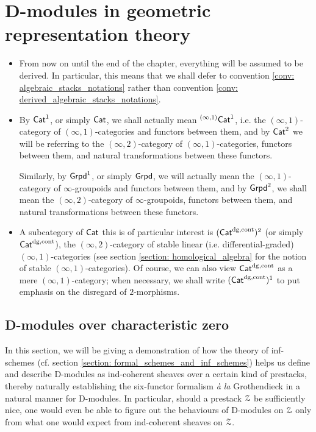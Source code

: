 \chapter{D-modules in geometric representation theory}
    \begin{abstract}
        
    \end{abstract}
    
    \minitoc
    
    \begin{convention} \label{conv: D_modules_everything_is_derived}
        \noindent
        \begin{itemize}
            \item From now on until the end of the chapter, everything will be assumed to be derived. In particular, this means that we shall defer to convention \ref{conv: algebraic_stacks_notations} rather than convention \ref{conv: derived_algebraic_stacks_notations}.
            \item By $\mathsf{Cat}^1$, or simply $\mathsf{Cat}$, we shall actually mean ${}^{(\infty, 1)}\mathsf{Cat}^1$, i.e. the $(\infty, 1)$-category of $(\infty, 1)$-categories and functors between them, and by $\mathsf{Cat}^2$ we will be referring to the $(\infty, 2)$-category of $(\infty, 1)$-categories, functors between them, and natural transformations between these functors. 
            
            Similarly, by $\mathsf{Grpd}^1$, or simply $\mathsf{Grpd}$, we will actually mean the $(\infty, 1)$-category of $\infty$-groupoids and functors between them, and by $\mathsf{Grpd}^2$, we shall mean the $(\infty, 2)$-category of $\infty$-groupoids, functors between them, and natural transformations between these functors.
            \item A subcategory of $\mathsf{Cat}$ this is of particular interest is $(\mathsf{Cat}^{\mathrm{dg}, \mathrm{cont}})^2$ (or simply $\mathsf{Cat}^{\mathrm{dg}, \mathrm{cont}}$), the $(\infty, 2)$-category of stable linear (i.e. differential-graded) $(\infty, 1)$-categories (see section \ref{section: homological_algebra} for the notion of stable $(\infty, 1)$-categories). Of course, we can also view $\mathsf{Cat}^{\mathrm{dg}, \mathrm{cont}}$ as a mere $(\infty, 1)$-category; when necessary, we shall write $(\mathsf{Cat}^{\mathrm{dg}, \mathrm{cont}})^1$ to put emphasis on the disregard of $2$-morphisms.
        \end{itemize} 
    \end{convention}
    
    \section{D-modules over characteristic zero}
        In this section, we will be giving a demonstration of how the theory of inf-schemes (cf. section \ref{section: formal_schemes_and_inf_schemes}) helps us define and describe D-modules as ind-coherent sheaves over a certain kind of prestacks, thereby naturally establishing the six-functor formalism \textit{\`a la} Grothendieck in a natural manner for D-modules. In particular, should a prestack $\mathcal{Z}$ be sufficiently nice, one would even be able to figure out the behaviours of D-modules on $\mathcal{Z}$ only from what one would expect from ind-coherent sheaves on $\mathcal{Z}$. 
        
